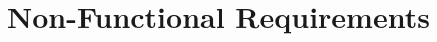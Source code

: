 \documentclass{article}
\begin{document}
\begin{addmargin}[4em]{0em}


\end{addmargin}

\vspace{2.5mm}


\section{Non-Functional Requirements}\label{sec:non-functionalReq}

\vspace{2.5mm}
\end{document}
